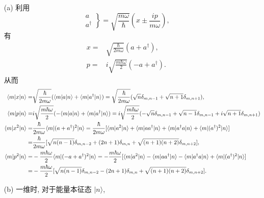 \documentclass{assignment}
\begin{document}
\begin{sol}
    \begin{itemize}
        \item[(a)] 利用
        \[
            \left.\begin{array}{l}
                a\\
                a^{\dagger}
            \end{array}\right\}=\sqrt{\frac{m\omega}{\hbar}}\left(x\pm\frac{ip}{m\omega}\right),
        \]
        有
        \begin{align}
            x=&\sqrt{\frac{\hbar}{2m\omega}}(a+a^{\dagger}),\\
            p=&i\sqrt{\frac{m\hbar\omega}{2}}(-a+a^{\dagger}).
        \end{align}
        从而
        \begin{align}
            \langle m\rvert x\lvert n\rangle=&\sqrt{\frac{\hbar}{2m\omega}}(\langle m\rvert a\lvert n\rangle+\langle m\rvert a^{\dagger}\lvert n\rangle)=\sqrt{\frac{\hbar}{2m\omega}}(\sqrt{n}\delta_{m,n-1}+\sqrt{n+1}\delta_{m,n+1}),\\
            \langle m\rvert p\lvert n\rangle=&i\sqrt{\frac{m\hbar\omega}{2}}(-\langle m\rvert a\lvert n\rangle+\langle m\rvert a^{\dagger}\lvert n\rangle)=i\sqrt{\frac{m\hbar\omega}{2}}(-\sqrt{n}\delta_{m,n-1}+\sqrt{n-1}\delta_{m,n-1}+i\sqrt{n+1}\delta_{m,n+1})\\
            \notag\langle m\rvert x^2\lvert n\rangle=&\frac{\hbar}{2m\omega}\langle m\rvert(a+a^{\dagger})^2\lvert n\rangle=\frac{\hbar}{2m\omega}[\langle m\rvert a^2\lvert n\rangle+\langle m\rvert aa^{\dagger}\lvert n\rangle+\langle m\rvert a^{\dagger}a\lvert n\rangle+\langle m\rvert(a^{\dagger})^2\lvert n\rangle]\\
            =&\frac{\hbar}{2m\omega}[\sqrt{n(n-1)}\delta_{m,n-2}+(2n+1)\delta_{m,n}+\sqrt{(n+1)(n+2)}\delta_{m,n+2}],\\
            \notag\langle m\rvert p^2\lvert n\rangle=&-\frac{m\hbar\omega}{2}\langle m\rvert(-a+a^{\dagger})^2\lvert n\rangle=-\frac{m\hbar\omega}{2}[\langle m\rvert a^2\lvert n\rangle-\langle m\rvert aa^{\dagger}\lvert n\rangle-\langle m\rvert a^{\dagger}a\lvert n\rangle+\langle m\rvert(a^{\dagger})^2\lvert n\rangle]\\
            =&-\frac{m\hbar\omega}{2}[\sqrt{n(n-1)}\delta_{m,n-2}-(2n+1)\delta_{m,n}+\sqrt{(n+1)(n+2)}\delta_{m,n+2}].
        \end{align}
        \item[(b)] 一维时, 对于能量本征态 $\lvert n\rangle$,

\end{itemize}
\end{sol}
\end{document}
